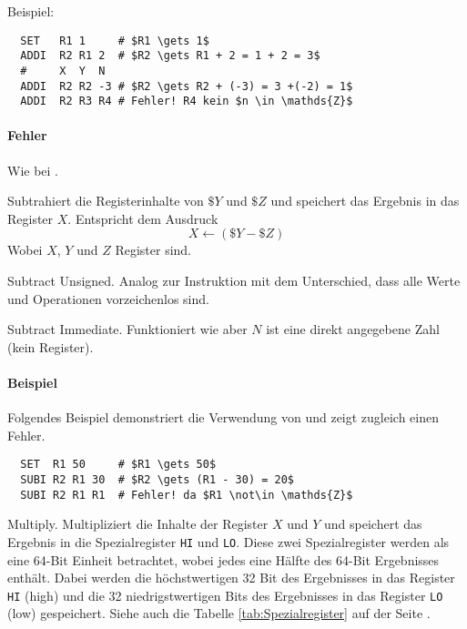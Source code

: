 Beispiel:
\begin{lstlisting}
  SET   R1 1     # $R1 \gets 1$
  ADDI  R2 R1 2  # $R2 \gets R1 + 2 = 1 + 2 = 3$
  #     X  Y  N
  ADDI  R2 R2 -3 # $R2 \gets R2 + (-3) = 3 +(-2) = 1$
  ADDI  R2 R3 R4 # Fehler! R4 kein $n \in \mathds{Z}$
\end{lstlisting}

\paragraph{Fehler}
Wie bei .


Subtrahiert die Registerinhalte von $\$Y$ und $\$Z$ und speichert das Ergebnis
in das Register $X$. Entspricht dem Ausdruck
\[
    X \gets (\$Y - \$Z)
\]
Wobei $X$, $Y$ und $Z$ Register sind.



\glqq Subtract Unsigned\grqq.
Analog zur Instruktion  mit dem Unterschied, dass alle Werte und
Operationen vorzeichenlos sind.



\glqq Subtract Immediate\grqq.
Funktioniert wie  aber $N$ ist eine direkt angegebene Zahl
(kein Register).

\paragraph{Beispiel}
Folgendes Beispiel demonstriert die Verwendung von  und zeigt
zugleich einen Fehler.
\begin{lstlisting}
  SET  R1 50     # $R1 \gets 50$
  SUBI R2 R1 30  # $R2 \gets (R1 - 30) = 20$
  SUBI R2 R1 R1  # Fehler! da $R1 \not\in \mathds{Z}$
\end{lstlisting}



\glqq Multiply\grqq. 
Multipliziert die Inhalte der Register $X$ und $Y$ und speichert das Ergebnis in
die Spezialregister \texttt{HI} und \texttt{LO}. Diese zwei Spezialregister
werden als eine 64-Bit Einheit betrachtet, wobei jedes eine Hälfte des
64-Bit Ergebnisses enthält.
Dabei werden die höchstwertigen 32 Bit des Ergebnisses in das Register
\texttt{HI} (high)
und die 32 niedrigstwertigen Bits des Ergebnisses in das Register
\texttt{LO} (low) gespeichert.
Siehe auch die Tabelle \ref{tab:Spezialregister} auf der Seite
\pageref{tab:Spezialregister}.

